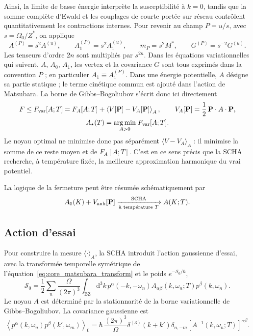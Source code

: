 Ainsi, la limite de basse énergie interprète la susceptibilité à $k=0$, tandis
que la somme complète d'Ewald et les couplages de courte portée sur réseau
contrôlent quantitativement les contractions internes. Pour revenir au champ
$P=u/s$, avec $s=\Omega_0/Z^*$, on applique
\begin{equation}
A^{(P)}=s^2A^{(u)},\qquad A_1^{(P)}=s^2A_1^{(u)},\qquad
m_P=s^2M^*,\qquad G^{(P)}=s^{-2}G^{(u)}.
\label{eq:core_scha_u_p_conversion}
\end{equation}
Les tenseurs d'ordre $2n$ sont multipliés par $s^{2n}$. Dans les équations
variationnelles qui suivent, $A$, $A_0$, $A_1$, les vertex et la covariance
$G$ sont tous exprimés dans la convention $P$ ; en particulier
$A_1\equiv A_1^{(P)}$. Dans une énergie potentielle, $A$ désigne sa partie
statique ; le terme cinétique commun est ajouté dans l'action de Matsubara.
La borne de Gibbs--Bogoliubov s'écrit donc ici directement
\begin{equation}
\begin{gathered}
F\leq F_{\rm var}[A;T]
=F_A[A;T]
+\left\langle
V[\mathbf P]-V_A[\mathbf P]
\right\rangle_A,
\qquad
V_A[\mathbf P]
=\frac12\,\mathbf P\mathbin{\cdot}A
\mathbin{\cdot}\mathbf P,\\
A_\star(T)=\underset{A>0}{\operatorname{arg\,min}}\;
F_{\rm var}[A;T].
\end{gathered}
\label{eq:core_gibbs_bogoliubov}
\end{equation}
Le noyau optimal ne minimise donc pas
séparément $\langle V-V_A\rangle_A$ : il minimise la somme de ce reste moyen et
de $F_A[A;T]$. C'est en ce sens précis que la SCHA recherche, à température
fixée, la meilleure approximation harmonique du vrai potentiel.

La logique de la fermeture peut être résumée schématiquement par
\begin{equation}
A_0(K)+V_{\rm anh}[\mathbf P]
\xrightarrow[\text{à température }T]{\mathrm{SCHA}}
A(K;T).
\label{eq:core_scha_mapping}
\end{equation}


\subsection{Action d'essai}

Pour construire la mesure $\langle\cdot\rangle_A$, la SCHA introduit l'action
gaussienne d'essai, avec la transformée temporelle symétrique de
l'équation~\eqref{eq:core_matsubara_transform} et le poids $e^{-\mathcal S_0/\hbar}$,
\begin{equation}
\mathcal S_0
=\frac12
\sum_n\frac{\Omega}{(2\pi)^3}\int_{\mathrm{BZ}}\!\mathrm d^3k\,
p^\alpha(-k,-\omega_n)
A_{\alpha\beta}(k,\omega_n;T)
p^\beta(k,\omega_n).
\label{eq:ann_action_essai}
\end{equation}
Le noyau $A$ est déterminé par la stationnarité de la borne variationnelle de
Gibbs--Bogoliubov. La covariance gaussienne est
\begin{equation}
\left\langle
p^\alpha(k,\omega_n)p^\beta(k',\omega_m)
\right\rangle_0
=\hbar\,\frac{(2\pi)^3}{\Omega}
\delta^{(3)}(k+k')\delta_{n,-m}
\left[A^{-1}(k,\omega_n;T)\right]^{\alpha\beta}.
\label{eq:ann_covariance}
\end{equation}

